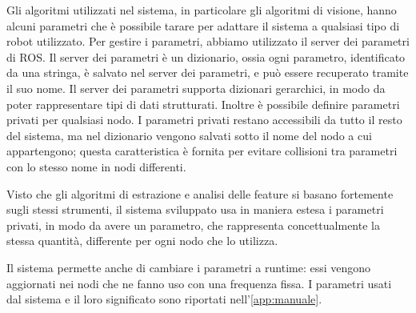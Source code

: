 Gli algoritmi utilizzati nel sistema, in particolare gli algoritmi di visione, hanno alcuni parametri che è possibile tarare per adattare il sistema a qualsiasi tipo di robot utilizzato.
Per gestire i parametri, abbiamo utilizzato il server dei parametri di ROS.
Il server dei parametri è un dizionario, ossia ogni parametro, identificato da una stringa, è salvato nel server dei parametri, e può essere recuperato tramite il suo nome. 
Il server dei parametri supporta dizionari gerarchici, in modo da poter rappresentare tipi di dati strutturati. 
Inoltre è possibile definire parametri privati per qualsiasi nodo. I parametri privati restano accessibili da tutto il resto del sistema, ma nel dizionario vengono salvati sotto il nome del nodo a cui appartengono; questa caratteristica è fornita per evitare collisioni tra parametri con lo stesso nome in nodi differenti.

Visto che gli algoritmi di estrazione e analisi delle feature si basano fortemente sugli stessi strumenti, il sistema sviluppato usa in maniera estesa i parametri privati, in modo da avere un parametro, che rappresenta concettualmente la stessa quantità, differente per ogni nodo che lo utilizza.

Il sistema permette anche di cambiare i parametri a runtime: essi vengono aggiornati nei nodi che ne fanno uso con una frequenza fissa.
I parametri usati dal sistema e il loro significato sono riportati nell'\autoref{app:manuale}.




